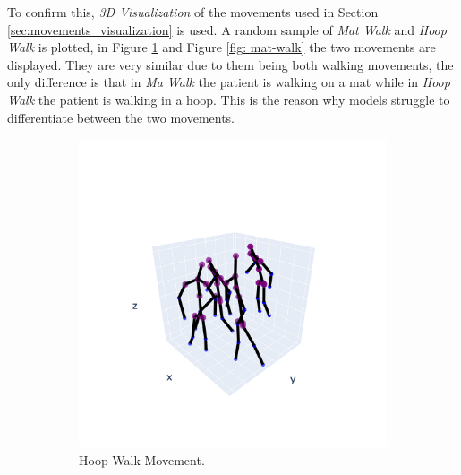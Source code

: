             \newpage

            To confirm this, \textit{3D Visualization} of the movements used in Section \ref{sec:movements_visualization} is used. A random sample of \textit{Mat Walk} and \textit{Hoop Walk} is plotted, in Figure \ref{fig: hoop-walk} and Figure \ref{fig: mat-walk} the two movements are displayed. They are very similar due to them being both walking movements, the only difference is that in \textit{Ma Walk} the patient is walking on a mat while in \textit{Hoop Walk} the patient is walking in a hoop. This is the reason why  models struggle to differentiate between the two movements.

            \begin{figure}[h]
                \begin{subfigure}{.5\textwidth}
                \centering
                  \includegraphics[width=1.\linewidth]{../src/resources/plots/movements/mov-1.png}
                  \caption{Hoop-Walk Movement.}
                  \label{fig: hoop-walk}
                \end{subfigure}
                \begin{subfigure}{.5\textwidth}
                \centering

\end{subfigure}
\end{figure}
